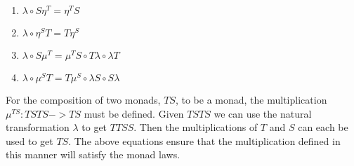\begin{enumerate}
\item 
$\lambda\circ S\eta^T = \eta^T S$
\item
$\lambda\circ \eta^S T = T\eta^S$
\item
$\lambda\circ S\mu^T = \mu^T S\circ T\lambda\circ\lambda T$
\item 
$\lambda\circ\mu^S T = T\mu^S\circ \lambda S\circ S\lambda$
\end{enumerate}
For the composition of two monads, $TS$, to be a monad, the multiplication $\mu^{TS}:TSTS->TS$ must be defined.  Given $TSTS$ we can use the natural transformation $\lambda$ to get $TTSS$.  Then the multiplications of $T$ and $S$ can each be used to get $TS$.  The above equations ensure that the multiplication defined in this manner will satisfy the monad laws.
%
%
%
%
%
